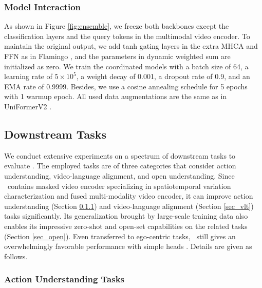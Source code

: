 \subsubsection{Model Interaction}

As shown in Figure \ref{fig:ensemble},
we freeze both backbones except the classification layers and the query tokens in the multimodal video encoder.
To maintain the original output,
we add tanh gating layers in the extra MHCA and FFN as in Flamingo \cite{alayrac2022flamingo}, 
and the parameters in dynamic weighted sum are initialized as zero.
We train the coordinated models with a batch size of 64, a learning rate of $5\times10^{5}$, a weight decay of 0.001, a dropout rate of 0.9, and an EMA rate of 0.9999.
Besides,
we use a cosine annealing schedule for 5 epochs with 1 warmup epoch.
All used data augmentations are the same as in UniFormerV2 \cite{uniformerv2}.


\subsection{Downstream Tasks} \label{sec_tasks}
We conduct extensive experiments on a spectrum of downstream tasks to evaluate \model. The employed tasks are of three categories that consider action understanding, video-language alignment, and open understanding. Since \model~contains masked video encoder specializing in spatiotemporal variation characterization and fused multi-modality video encoder, it can improve action understanding (Section \ref{sec_action}) and video-language alignment (Section \ref{sec_vlt}) tasks significantly. Its generalization brought by large-scale training data also enables its impressive zero-shot and open-set capabilities on the related tasks (Section \ref{sec_open}). Even transferred to ego-centric tasks, \model~still gives an overwhelmingly favorable performance with simple heads \cite{chen2022ego4d}. Details are given as follows.






\subsubsection{Action Understanding Tasks}
\label{sec_action}








